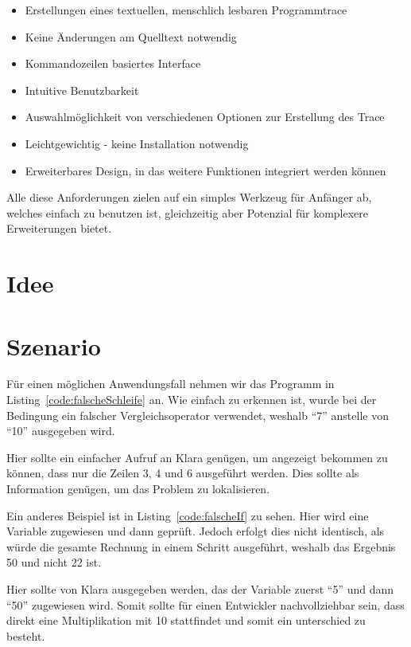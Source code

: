 \begin{itemize}
	\item Erstellungen eines textuellen, menschlich lesbaren Programmtrace
	\item Keine Änderungen am Quelltext notwendig
	\item Kommandozeilen basiertes Interface
	\item Intuitive Benutzbarkeit
	\item Auswahlmöglichkeit von verschiedenen Optionen zur Erstellung des Trace
	\item Leichtgewichtig - keine Installation notwendig
	\item Erweiterbares Design, in das weitere Funktionen integriert werden können
\end{itemize}

Alle diese Anforderungen zielen auf ein simples Werkzeug für Anfänger ab, welches einfach zu benutzen ist, gleichzeitig aber Potenzial für komplexere Erweiterungen bietet.

\section{Idee} 



\section{Szenario} 

Für einen möglichen Anwendungsfall nehmen wir das Programm in Listing~\ref{code:falscheSchleife} an. Wie einfach zu erkennen ist, wurde bei der Bedingung ein falscher Vergleichsoperator verwendet, weshalb "`7"' anstelle von "`10"' ausgegeben wird.



Hier sollte ein einfacher Aufruf an Klara genügen, um angezeigt bekommen zu können, dass nur die Zeilen 3, 4 und 6 ausgeführt werden. Dies sollte als Information genügen, um das Problem zu lokalisieren.

Ein anderes Beispiel ist in Listing~\ref{code:falscheIf} zu sehen. Hier wird eine Variable zugewiesen und dann geprüft. Jedoch erfolgt dies nicht identisch, als würde die gesamte Rechnung in einem Schritt ausgeführt, weshalb das Ergebnis 50 und nicht 22 ist.



Hier sollte von Klara ausgegeben werden, das der Variable  zuerst "`5"' und dann "`50"' zugewiesen wird. Somit sollte für einen Entwickler nachvollziehbar sein, dass direkt eine Multiplikation mit 10 stattfindet und somit ein unterschied zu  besteht.